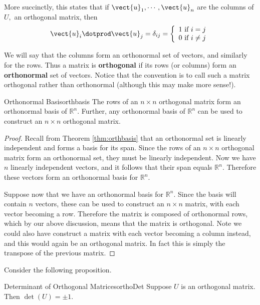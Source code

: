 More succinctly, this states that if $\vect{u}_{1},\cdots ,\vect{u}_{n}$
are the columns of $U,$ an orthogonal matrix, then 
\[
\vect{u}_{i}\dotprod \vect{u}_{j}=\delta _{ij} = \left\{ 
\begin{array}{c}
1\text{ if }i=j \\ 
0\text{ if }i\neq j
\end{array}
\right.  
\]

We will say that the columns form an orthonormal set of vectors, and similarly for the rows. Thus a matrix is \textbf{orthogonal} if its rows (or columns) form an
\textbf{orthonormal} set of vectors. Notice that the convention is to call such a matrix orthogonal rather than orthonormal (although this may make more sense!). 

\begin{proposition}{Orthonormal Basis}{orthbasis}
The rows of an $n \times n$ orthogonal matrix form an orthonormal
basis of $\mathbb{R}^n$. Further, any orthonormal basis of
$\mathbb{R}^n$ can be used to construct an $n \times n$ orthogonal
matrix.
\end{proposition}

\begin{proof}
Recall from Theorem \ref{thm:orthbasis} that an orthonormal set is
linearly independent and forms a basis for its span. Since the rows of
an $n \times n$ orthogonal matrix form an orthonormal set, they must
be linearly independent. Now we have $n$ linearly independent vectors,
and it follows that their span equals $\mathbb{R}^n$. Therefore these
vectors form an orthonormal basis for $\mathbb{R}^n$.

Suppose now that we have an orthonormal basis for $\mathbb{R}^n$. Since the
basis will contain $n$ vectors, these can be used to construct an $n
\times n$ matrix, with each vector becoming a row. Therefore the
matrix is composed of orthonormal rows, which by our above discussion,
means that the matrix is orthogonal. Note we could also have construct
a matrix with each vector becoming a column instead, and this would
again be an orthogonal matrix. In fact this is simply the transpose of
the previous matrix.
\end{proof}

Consider the following proposition.

\begin{proposition}{Determinant of Orthogonal Matrices}{orthoDet}
Suppose $U$ is an orthogonal matrix. Then $\det \left( U\right) = \pm 1.$ 
\end{proposition}

